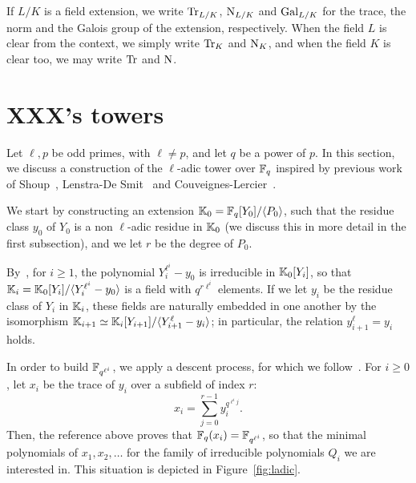 \documentclass{sig-alternate}
\begin{document}

If $L/K$ is a field extension, we write $\operatorname{Tr}_{L/K}$, $\operatorname{N}_{L/K}$ and
$\operatorname{Gal}_{L/K}$ for the trace, the norm and the Galois group of the
extension, respectively. When the field $L$ is clear from the context,
we simply write $\operatorname{Tr}_K$ and $\operatorname{N}_K$, and when the field $K$ is clear
too, we may write $\operatorname{Tr}$ and $\operatorname{N}$.


\section{XXX's towers}
\label{sec:LDtower}

Let $\ell,p$ be odd primes, with $\ell \ne p$, and let $q$ be a power
of $p$. In this section, we discuss a construction of the $\ell$-adic
tower over $\mathbb{F}_q$ inspired by previous work of
Shoup~\cite{Shoup90,shoup94}, Lenstra-De
Smit~\cite{lenstra+desmit08-stdmodels} and
Couveignes-Lercier~\cite{couveignes+lercier11}.

We start by constructing an extension $\mathbb{K}_0 = \mathbb{F}_q[Y_0]/\langle P_0
\rangle$, such that the residue class $y_0$ of $Y_0$ is a non
$\ell$-adic residue in $\mathbb{K}_0$ (we discuss this in more detail in the
first subsection), and we let $r$ be the degree of $P_0$.

By~\cite[Th.~VI.9.1]{lang}, for $i\ge 1$, the polynomial
$Y_i^{\ell^i}-y_0$ is irreducible in $\mathbb{K}_0[Y_i]$, so that $\mathbb{K}_i=
\mathbb{K}_0[Y_i]/\langle Y_i^{\ell^i}-y_0\rangle$ is a field with $q^{r
  \ell^i}$ elements.  If we let $y_i$ be the residue class of $Y_i$ in
$\mathbb{K}_i$, these fields are naturally embedded in one another by the
isomorphism $\mathbb{K}_{i+1} \simeq \mathbb{K}_i[Y_{i+1}]/\langle
Y_{i+1}^\ell-y_i\rangle$; in particular, the relation
$y_{i+1}^\ell=y_i$ holds.

In order to build $\mathbb{F}_{q^{\ell^i}}$, we apply a descent process, for
which we follow~\cite[Th.~2.1]{Shoup90}. For $i \ge 0$, let $x_i$ be
the trace of $y_i$ over a subfield of index $r$:
\begin{equation}\label{eq-def:xi}
x_i = \sum_{j = 0}^{r-1} y_i^{q^{\ell^i j}}.  
\end{equation}
Then, the reference above proves that
$\mathbb{F}_q(x_i)=\mathbb{F}_{q^{\ell^i}}$, so that the minimal polynomials
 of $x_1,x_2,\dots$ for the family of irreducible polynomials
$Q_i$ we are interested in. This situation is depicted in
Figure~\ref{fig:ladic}.
\end{document}
